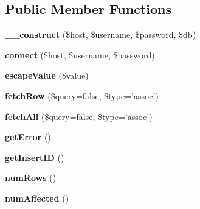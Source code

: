 \subsection*{Public Member Functions}
\begin{DoxyCompactItemize}
\item 
\hypertarget{interfacedatabase_adapter_a81fcddb424f13e0862ee3f7e1ea57ce9}{
{\bfseries \_\-\_\-construct} (\$host, \$username, \$password, \$db)}
\label{interfacedatabase_adapter_a81fcddb424f13e0862ee3f7e1ea57ce9}

\item 
\hypertarget{interfacedatabase_adapter_a4c4f3316747e665b9e02f6ddcba4117c}{
{\bfseries connect} (\$host, \$username, \$password)}
\label{interfacedatabase_adapter_a4c4f3316747e665b9e02f6ddcba4117c}

\item 
\hypertarget{interfacedatabase_adapter_a039ae2e8f2bf579fd75d9df8df87eee3}{
{\bfseries escapeValue} (\$value)}
\label{interfacedatabase_adapter_a039ae2e8f2bf579fd75d9df8df87eee3}

\item 
\hypertarget{interfacedatabase_adapter_a529385852efa66f19288496930ee5394}{
{\bfseries fetchRow} (\$query=false, \$type='assoc')}
\label{interfacedatabase_adapter_a529385852efa66f19288496930ee5394}

\item 
\hypertarget{interfacedatabase_adapter_a861f65695740a1d866ce1001f0ae706d}{
{\bfseries fetchAll} (\$query=false, \$type='assoc')}
\label{interfacedatabase_adapter_a861f65695740a1d866ce1001f0ae706d}

\item 
\hypertarget{interfacedatabase_adapter_a24ada5decce3d1b79cd82f5a90ccf404}{
{\bfseries getError} ()}
\label{interfacedatabase_adapter_a24ada5decce3d1b79cd82f5a90ccf404}

\item 
\hypertarget{interfacedatabase_adapter_ac73f1d8cddbdfc35ca442189378a073c}{
{\bfseries getInsertID} ()}
\label{interfacedatabase_adapter_ac73f1d8cddbdfc35ca442189378a073c}

\item 
\hypertarget{interfacedatabase_adapter_af37433a300db1f607ee789d22828a0a0}{
{\bfseries numRows} ()}
\label{interfacedatabase_adapter_af37433a300db1f607ee789d22828a0a0}

\item 
\hypertarget{interfacedatabase_adapter_acac8dfe61e7840f9a1e672ebede0be21}{
{\bfseries numAffected} ()}
\label{interfacedatabase_adapter_acac8dfe61e7840f9a1e672ebede0be21}


\end{DoxyCompactItemize}
